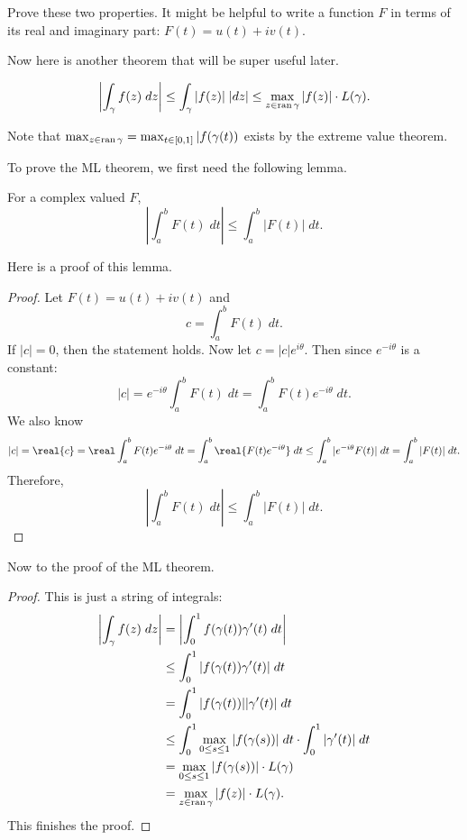 \documentclass[notes]{subfile}
\begin{document}
\begin{exercise}
    Prove these two properties.
    It might be helpful to write a function $F$ in terms of
    its real and imaginary part: $F(t) = u(t) + iv(t)$.
\end{exercise}

Now here is another theorem that will be super useful later.
\begin{theorem}[ML Theorem]
    \[ \left| \int_{\gamma} f(z) \; dz \right| \le
        \int_{\gamma} |f(z)| \; |dz| \le
    \max_{z \in \operatorname{ran}{\gamma}} |f(z)| \cdot L(\gamma). \]
\end{theorem}

Note that $\max_{z \in \operatorname{ran}{\gamma}} = \max_{t \in [0,1]} |f(\gamma(t))$ exists by the extreme value theorem. 

To prove the ML theorem, we first need the following lemma.
\begin{lemma}
    For a complex valued $F$,
    \[ \left| \int_a^b F(t) \; dt \right| \le 
    \int_a^b |F(t)| \; dt. \]
\end{lemma}

Here is a proof of this lemma.
\begin{proof}
    Let $F(t) = u(t) + iv(t)$ and
    \[ c = \int_a^b F(t) \; dt. \]
    If $|c| = 0$, then the statement holds.
    Now let $c = |c| e^{i\theta}$.
    Then since $e^{-i\theta}$ is a constant:
    \[ |c| = e^{-i\theta} \int_a^b F(t) \; dt = \int_a^b 
    F(t)e^{-i\theta} \; dt. \]
    We also know
    \[ |c| = \real{c} = \real \int_a^b F(t)e^{-i\theta} \; dt
        = \int_a^b \real{F(t) e^{-i\theta}} \; dt
        \le \int_a^b |e^{-i\theta} F(t)| \; dt 
    = \int_a^b |F(t)| \; dt. \]
    Therefore,
    \[ \left| \int_a^b F(t) \; dt \right| \le 
    \int_a^b |F(t)| \; dt. \]

\end{proof}

Now to the proof of the ML theorem.
\begin{proof}
    This is just a string of integrals:
    \begin{align*}
        \left| \int_{\gamma} f(z) \; dz \right| &= 
        \left| \int_0^1 f(\gamma(t))\gamma'(t) \; dt \right| \\
        &\le \int_0^1 |f(\gamma(t))\gamma'(t)| \; dt \\
        &= \int_0^1 |f(\gamma(t))| |\gamma'(t)| \; dt \\
        &\le \int_0^1 \max_{0 \le s \le 1} |f(\gamma(s))| \; dt
        \cdot \int_0^1 |\gamma'(t)| \; dt \\
        &= \max_{0 \le s \le 1} |f(\gamma(s))| \cdot L(\gamma) \\
        &= \max_{z \in \operatorname{ran}{\gamma}} |f(z)| \cdot L(\gamma).
    \end{align*}
    This finishes the proof.
\end{proof}
\end{document}
